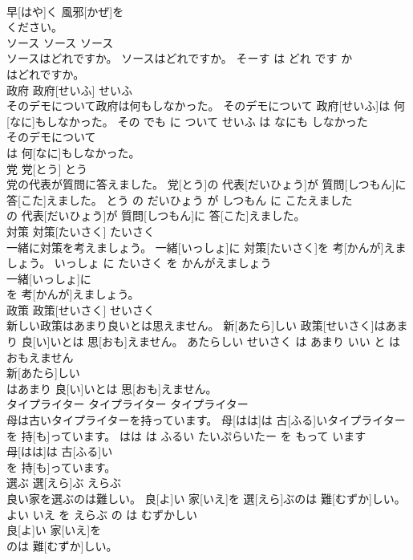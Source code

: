 \documentclass[8pt]{extreport}
\begin{document}
\begin{CJK}{UTF8}{min}
\\	早[はや]く 風邪[かぜ]を
\\	ください。		
\\	ソース	ソース	ソース	
\\	ソースはどれですか。	ソースはどれですか。	そーす は どれ です か	
\\	はどれですか。		
\\	政府	政府[せいふ]	せいふ	
\\	そのデモについて政府は何もしなかった。	そのデモについて 政府[せいふ]は 何[なに]もしなかった。	その でも に ついて せいふ は なにも しなかった	
\\	そのデモについて
\\	は 何[なに]もしなかった。		
\\	党	党[とう]	とう	
\\	党の代表が質問に答えました。	党[とう]の 代表[だいひょう]が 質問[しつもん]に 答[こた]えました。	とう の だいひょう が しつもん に こたえました	
\\	の 代表[だいひょう]が 質問[しつもん]に 答[こた]えました。		
\\	対策	対策[たいさく]	たいさく	
\\	一緒に対策を考えましょう。	一緒[いっしょ]に 対策[たいさく]を 考[かんが]えましょう。	いっしょ に たいさく を かんがえましょう	
\\	一緒[いっしょ]に
\\	を 考[かんが]えましょう。		
\\	政策	政策[せいさく]	せいさく	
\\	新しい政策はあまり良いとは思えません。	新[あたら]しい 政策[せいさく]はあまり 良[い]いとは 思[おも]えません。	あたらしい せいさく は あまり いい と は おもえません	
\\	新[あたら]しい
\\	はあまり 良[い]いとは 思[おも]えません。		
\\	タイプライター	タイプライター	タイプライター	
\\	母は古いタイプライターを持っています。	母[はは]は 古[ふる]いタイプライターを 持[も]っています。	はは は ふるい たいぷらいたー を もって います	
\\	母[はは]は 古[ふる]い
\\	を 持[も]っています。		
\\	選ぶ	選[えら]ぶ	えらぶ	
\\	良い家を選ぶのは難しい。	良[よ]い 家[いえ]を 選[えら]ぶのは 難[むずか]しい。	よい いえ を えらぶ の は むずかしい	
\\	良[よ]い 家[いえ]を
\\	のは 難[むずか]しい。		

\end{CJK}
\end{document}
